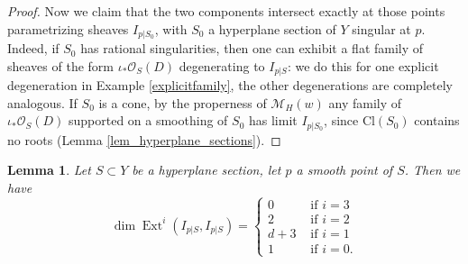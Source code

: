 \documentclass[11pt]{amsart}
\newtheorem{lemma}[thm]{Lemma}
\theoremstyle{definition}
\newcommand{\C}{\mathbb{C}}
\newcommand{\N}{\mathbb{N}}
\DeclareMathOperator{\Ext}{Ext}
\DeclareMathOperator{\Ch}{ch}
\DeclareMathOperator{\NS}{NS\,}
\newcommand{\sO}{\mathcal{O}}
\newcommand{\sM}{\mathcal{M}}
\newcommand{\AAA}[1]{\textcolor{red}{#1}}
\renewcommand{\P}{\mathbb{P}}
\newcommand{\sI}{\mathcal{I}}
\begin{document}
\begin{proof}
Now we claim that the two components intersect exactly at those points parametrizing sheaves $I_{p|S_0}$, with $S_0$ a hyperplane section of $Y$ singular at $p$. Indeed, if $S_0$ has rational singularities, then one can exhibit a flat family of sheaves of the form $\iota_*\sO_S(D)$ degenerating to $I_{p|S}$: we do this for one explicit degeneration in Example \ref{explicitfamily}, the other degenerations are completely analogous. If $S_0$ is a cone, by the properness of $\sM_H(w)$ any family of $\iota_*\sO_S(D)$ supported on a smoothing of $S_0$ has limit $I_{p|S_0}$, since $\mathrm{Cl}(S_0)$ contains no roots (Lemma \ref{lem_hyperplane_sections}). 
\end{proof}

\begin{lemma}\label{d+3}
Let $S\subset Y$ be a hyperplane section, let $p$ a smooth  point of $S$. Then we have
$$\dim \Ext^i(I_{p|S},I_{p|S})=\begin{cases}
0 & \text{ if }i=3\\
2 & \text{ if }i=2\\
d+3 & \text{ if }i=1\\
1  & \text{ if }i=0.\end{cases}
$$  
\end{lemma}
\end{document}
